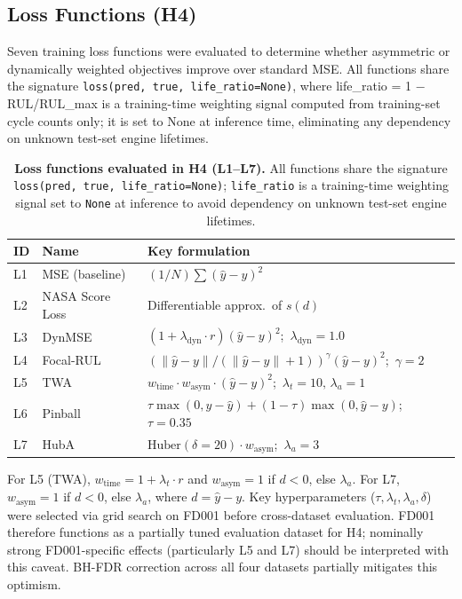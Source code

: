 \documentclass[preprint,10pt]{elsarticle}
\begin{document}
\subsection{Loss Functions (H4)}

Seven training loss functions were evaluated to determine whether asymmetric or dynamically weighted objectives improve over standard MSE. All functions share the signature \texttt{loss(pred, true, life\_ratio=None)}, where life_ratio = 1 − RUL/RUL_max is a training-time weighting signal computed from training-set cycle counts only; it is set to None at inference time, eliminating any dependency on unknown test-set engine lifetimes.

\begin{table}[!t]
\centering
\small
\caption*{\textbf{Loss functions evaluated in H4 (L1--L7).} All functions share the signature \texttt{loss(pred, true, life\_ratio=None)}; \texttt{life\_ratio} is a training-time weighting signal set to \texttt{None} at inference to avoid dependency on unknown test-set engine lifetimes.}
\label{tab:4}
\begin{tabular}{lll}
\toprule
\textbf{ID} & \textbf{Name} & \textbf{Key formulation} \\
\midrule
L1 & MSE (baseline) & $(1/N)\sum (\hat{y}-y)^2$ \\
L2 & NASA Score Loss & Differentiable approx.\ of $s(d)$ \\
L3 & DynMSE & $(1+\lambda_{\text{dyn}}{\cdot}r)(\hat{y}-y)^2$;\ $\lambda_{\text{dyn}}=1.0$ \\
L4 & Focal-RUL & $({\|\hat{y}-y\|}/{(\|\hat{y}-y\|+1)})^{\gamma}(\hat{y}-y)^2$;\ $\gamma=2$ \\
L5 & TWA & $w_{\text{time}}{\cdot}w_{\text{asym}}{\cdot}(\hat{y}-y)^2$;\ $\lambda_t=10,\,\lambda_a=1$ \\
L6 & Pinball & $\tau\max(0,y{-}\hat{y})+(1{-}\tau)\max(0,\hat{y}{-}y)$;\ $\tau=0.35$ \\
L7 & HubA & $\text{Huber}(\delta{=}20){\cdot}w_{\text{asym}}$;\ $\lambda_a=3$ \\
\bottomrule
\end{tabular}
\end{table}


For L5 (TWA), $w_{\text{time}} = 1 + \lambda_t \cdot r$ and $w_{\text{asym}} = 1$ if $d < 0$, else $\lambda_a$. For L7, $w_{\text{asym}} = 1$ if $d < 0$, else $\lambda_a$, where $d = \hat{y} - y$. Key hyperparameters ($\tau, \lambda_t, \lambda_a, \delta$) were selected via grid search on FD001 before cross-dataset evaluation. FD001 therefore functions as a partially tuned evaluation dataset for H4; nominally strong FD001-specific effects (particularly L5 and L7) should be interpreted with this caveat. BH-FDR correction across all four datasets partially mitigates this optimism.
\end{document}
